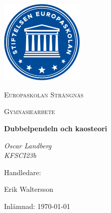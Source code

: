 \documentclass[a4paper, 12pt]{report}
\begin{document}
\begin{titlepage}
	\centering
	\includegraphics[width=0.3\textwidth]{europaskolan.png}\par\vspace{1cm}
	{\LARGE \textsc{Europaskolan Strängnäs}\par}
	\vspace{1cm}
	{\Large \textsc{Gymnasiearbete}\par}
	\vspace{1.5cm}
	{\huge\bfseries Dubbelpendeln och kaosteori \par}
	\vspace{2cm}
	{\Large\itshape Oscar Landberg \\
		KFSCI23b\par}
	\vfill
	Handledare:\par
    \vspace{-1.5mm}
	Erik Waltersson

	\vfill

	{\large Inlämnad: \today}
\end{titlepage}



\end{document}
